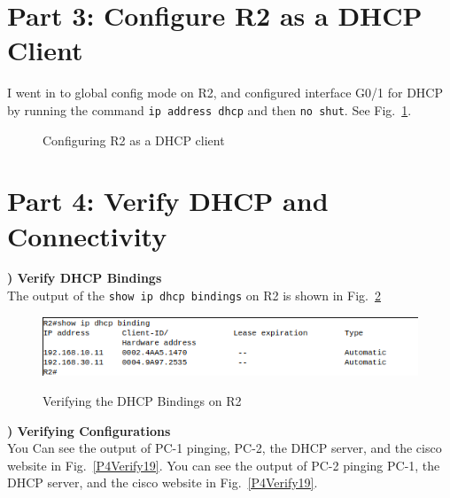 \documentclass{report}
\newcommand{\mysection}[1]{\section*{#1}}
\newcommand{\mysubsection}[2]{\textbf{\romannumeral #1) #2}}
\begin{document}
\mysection{\textbf{Part 3: Configure R2 as a DHCP Client}}
I went in to global config mode on R2, and configured interface G0/1 for DHCP by
running the command
{\scriptsize{\verb$ip address dhcp$}\normalsize} and then 
{\scriptsize{\verb$no shut$}\normalsize}. See Fig.~\ref{P3Config19}.


\begin{figure}[!hbt]\centering
{}\hfill
{}\par 
\caption{Configuring R2 as a DHCP client}\label{P3Config19}
\end{figure}

\mysection{\textbf{Part 4: Verify DHCP and Connectivity}}
\mysubsection{1}{Verify DHCP Bindings}\\
The output of the {\scriptsize{\verb$show ip dhcp bindings$}\normalsize} on R2
is shown in Fig.~\ref{P4Config19}


\begin{figure}[!h]
    \centering
    {\label{P4Config19}\includegraphics[width=.45\linewidth]{Figures/P4/2020-03-26-210759_534x84_scrot.png}}
  \caption{Verifying the DHCP Bindings on R2}
\end{figure}

\noindent\mysubsection{2}{Verifying Configurations}\\
You Can see the output of PC-1 pinging, PC-2, the DHCP server, and the cisco
website in Fig.~\ref{P4Verify19}. You can see the output of
PC-2 pinging PC-1, the DHCP server, and the cisco website in
Fig.~\ref{P4Verify19}.
\end{document}
